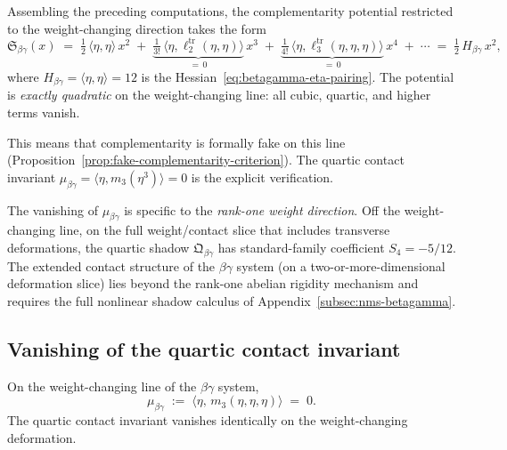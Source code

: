 Assembling the preceding computations, the complementarity potential
restricted to the weight-changing direction takes the form
\begin{equation}\label{eq:betagamma-potential-weight-line}
 \mathfrak{S}_{\beta\gamma}(x)
 \;=\;
 \tfrac{1}{2}\,\langle \eta,\eta \rangle\, x^2
 \;+\;
 \underbrace{\tfrac{1}{3!}\,\langle \eta,\ell_2^{\mathrm{tr}}
 (\eta,\eta)\rangle}_{=\,0}\, x^3
 \;+\;
 \underbrace{\tfrac{1}{4!}\,\langle \eta,\ell_3^{\mathrm{tr}}
 (\eta,\eta,\eta)\rangle}_{=\,0}\, x^4
 \;+\; \cdots
 \;=\;
 \tfrac{1}{2}\,H_{\beta\gamma}\, x^2,
\end{equation}
where $H_{\beta\gamma} = \langle\eta,\eta\rangle = 12$ is the
Hessian~\eqref{eq:betagamma-eta-pairing}. The potential is
\emph{exactly quadratic} on the weight-changing line:
all cubic, quartic, and higher terms vanish.

This means that complementarity is formally fake on this line
(Proposition~\ref{prop:fake-complementarity-criterion}).
The quartic contact invariant
$\mu_{\beta\gamma} = \langle \eta, m_3(\eta^3) \rangle = 0$
is the explicit verification.

\begin{remark}
\label{rem:betagamma-off-weight-line}
The vanishing of $\mu_{\beta\gamma}$ is specific to the
\emph{rank-one weight direction}.
Off the weight-changing line, on the full weight/contact
slice that includes transverse deformations, the quartic
shadow $\mathfrak{Q}_{\beta\gamma}$ has standard-family coefficient
$S_4=-5/12$.
The extended contact structure of the $\beta\gamma$ system
(on a two-or-more-dimensional deformation slice) lies beyond
the rank-one abelian rigidity mechanism and requires the full
nonlinear shadow calculus of
Appendix~\ref{subsec:nms-betagamma}.
\end{remark}

\subsection{Vanishing of the quartic contact invariant}

\begin{corollary}
\label{cor:betagamma-mu-vanishing}
\ClaimStatusProvedHere
{}
On the weight-changing line of the $\beta\gamma$ system,
\[
 \mu_{\beta\gamma}
 \;:=\;
 \langle \eta,\, m_3(\eta,\eta,\eta) \rangle
 \;=\; 0.
\]
The quartic contact invariant vanishes identically on the weight-changing
deformation.
\end{corollary}

